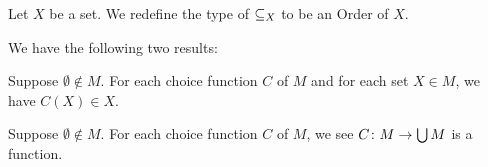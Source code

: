 \documentclass{article}
\begin{document}
\begin{definition}
  Let $X$ be a set.
  We redefine the type of $\mathord{\subseteq_{X}}$ to be an Order of $X$.
\end{definition}

We have the following two results:
\begin{thm}
\item\label{orders1:89} Suppose $\emptyset\notin M$. For each choice
  function $C$ of $M$ and for each set $X\in M$, we have $C(X)\in X$.
\item\label{orders1:90} Suppose $\emptyset\notin M$. For each choice
  function $C$ of $M$, we see $C\colon M\to\bigcup M$ is a function.
\end{thm}
\end{document}
